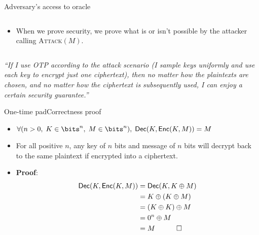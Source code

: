 \documentclass[aspectratio=169, lualatex, handout]{beamer}
\begin{document}
\begin{frame}{Adversary's access to oracle}
	\begin{columns}[c]
		\begin{column}{0.5\textwidth}
			\begin{itemize}
				\item When we prove security, we prove what is or isn't possible by the attacker calling \textsc{Attack}$(M)$.
			\end{itemize}
		\end{column}
		\begin{column}{0.5\textwidth}
		\end{column}
	\end{columns}
\end{frame}

\begin{frame}
	\begin{center}
		\Large\textit{``If I use OTP according to the attack scenario (I sample keys uniformly and use each key to encrypt just one ciphertext), then no matter how the plaintexts are chosen, and no matter how the ciphertext is subsequently used, I can enjoy a certain security guarantee.''}
	\end{center}
\end{frame}

\begin{frame}{One-time pad}{Correctness proof}
	\begin{itemize}[<+->]
		\item $\forall(n > 0,\; K \in \bits^{n},\; M \in \bits^{n}),\; \textsf{Dec}(K, \textsf{Enc}(K, M)) = M$
		\item For all positive $n$, any key of $n$ bits and message of $n$ bits will decrypt back to the same plaintext if encrypted into a ciphertext.
		\item \textbf{Proof}:
		      \begin{align*}
			      \textsf{Dec}(K, \textsf{Enc}(K, M)) & = \textsf{Dec}(K, K \oplus M) \\
			                                          & = K \oplus (K \oplus M)       \\
			                                          & = (K \oplus K) \oplus M       \\
			                                          & = 0^n \oplus M                \\
			                                          & = M \quad \qed
		      \end{align*}
	\end{itemize}
\end{frame}
\end{document}
